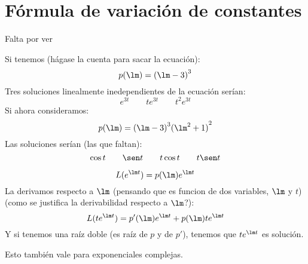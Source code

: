\section{Fórmula de variación de constantes}
Falta por ver


\begin{ejemplo}
    Si tenemos (hágase la cuenta para sacar la ecuación):
    \begin{equation*}
        p(\lm) = {(\lm-3)}^{3}
    \end{equation*}
    Tres soluciones linealmente inedependientes de la ecuación serían:
    \begin{equation*}
        e^{3t} \qquad te^{3t} \qquad t^2e^{3t}
    \end{equation*}
    Si ahora consideramos:
    \begin{equation*}
        p(\lm) = {(\lm-3)}^{3}{(\lm^2 + 1)}^{2}
    \end{equation*}
    Las soluciones serían (las que faltan):
    \begin{equation*}
        \cos t \qquad \sen t \qquad t\cos t \qquad t\sen t
    \end{equation*}
\end{ejemplo}

\begin{equation*}
    L(e^{\lm t}) = p(\lm) e^{\lm t}
\end{equation*}
La derivamos respecto a $\lm$ (pensando que es funcion de dos variables, $\lm$ y $t$) (como se justifica la derivabilidad respecto a $\lm$?):
\begin{equation*}
    L(te^{\lm t}) = p'(\lm) e^{\lm t} + p(\lm) t e^{\lm t}
\end{equation*}
Y si tenemos una raíz doble (es raíz de $p$ y de $p'$), tenemos que $te^{\lm t}$ es solución.

Esto también vale para exponenciales complejas.
